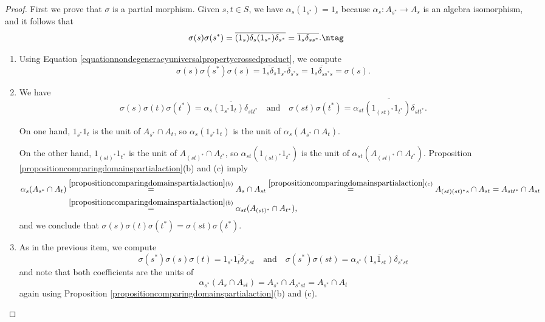 \begin{proof}
First we prove that $\sigma$ is a partial morphism. Given $s,t\in S$, we have $\alpha_s(1_{s^*})=1_s$ because $\alpha_s:A_{s^*}\to A_s$ is an algebra isomorphism, and it follows that
\[\sigma(s)\sigma(s^*)=\overline{(1_s)\delta_s(1_{s^*})\delta_{s^*}}=\overline{1_s\delta_{ss^*}}.\ntag\label{equationnondegeneracyuniversalpropertycrossedproduct}\]
\begin{enumerate}
\item[(PM1)]  Using Equation \ref{equationnondegeneracyuniversalpropertycrossedproduct}, we compute
\[\sigma(s)\sigma(s^*)\sigma(s)=\overline{1_s\delta_s}\overline{1_{s^*}\delta_{s^*s}}=\overline{1_s\delta_{ss^*s}}=\sigma(s).\]
\item[(PM2)] We have
\[\sigma(s)\sigma(t)\sigma(t^*)=\overline{\alpha_s(1_{s^*}1_t)\delta_{stt^*}}\quad\text{and}\quad\sigma(st)\sigma(t^*)=\overline{\alpha_{st}(1_{(st)^*}1_{t^*})\delta_{stt^*}}.\]

On one hand, $1_{s^*}1_t$ is the unit of $A_{s^*}\cap A_t$, so $\alpha_s(1_{s^*}1_t)$ is the unit of $\alpha_s(A_{s^*}\cap A_t)$.

On the other hand, $1_{(st)^*}1_{t^*}$ is the unit of $A_{(st)^*}\cap A_{t^*}$, so $\alpha_{st}(1_{(st)^*}1_{t^*})$ is the unit of $\alpha_{st}(A_{(st)^*}\cap A_{t^*})$. Proposition \ref{propositioncomparingdomainspartialaction}(b) and (c) imply
\begin{align*}
\alpha_s(A_{s^*}\cap A_t)&\overset{\ref{propositioncomparingdomainspartialaction}(b)}{=}A_s\cap A_{st}\overset{\ref{propositioncomparingdomainspartialaction}(c)}{=}A_{(st)(st)^*s}\cap A_{st}=A_{stt^*}\cap A_{st}\\\
&\overset{\ref{propositioncomparingdomainspartialaction}(b)}{=}\alpha_{st}(A_{(st)^*}\cap A_{t^*}),
\end{align*}
and we conclude that $\sigma(s)\sigma(t)\sigma(t^*)=\sigma(st)\sigma(t^*)$.
\item[(PM3)] As in the previous item, we compute
\[\sigma(s^*)\sigma(s)\sigma(t)=\overline{1_{s^*}1_t\delta_{s^*st}}\quad\text{and}\quad\sigma(s^*)\sigma(st)=\overline{\alpha_{s^*}(1_s1_{st})\delta_{s^*st}}\]
and note that both coefficients are the units of
\[\alpha_{s^*}(A_s\cap A_{st})=A_{s^*}\cap A_{s^*st}=A_{s^*}\cap A_t\]
again using Proposition \ref{propositioncomparingdomainspartialaction}(b) and (c).
\end{enumerate}


\end{proof}
